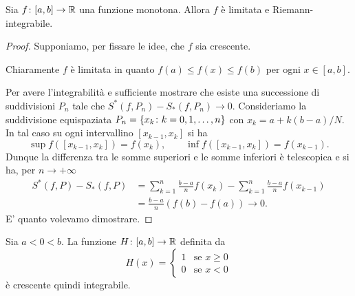   \begin{theorem}
  \label{th:integrabilita_monotone}%
  Sia $f\colon [a,b]\to {\mathbb R}$ una funzione monotona. Allora $f$ è limitata e
  Riemann-integrabile.
  \end{theorem}
  \begin{proof}
  Supponiamo, per fissare le idee, che $f$ sia crescente.
  
  Chiaramente $f$ è limitata in quanto $f(a) \le f(x) \le f(b)$ per ogni
  $x\in [a,b]$.
  
  Per avere l'integrabilità e sufficiente mostrare
  che esiste una successione di suddivisioni $P_n$
  tale che $S^*(f,P_n) - S_*(f,P_n) \to 0$.
  Consideriamo la suddivisione equispaziata
  $P_n={\left\{ x_k \colon k=0,1, \dots, n \right\}}$ con $x_k=a+k(b-a)/N$.
  In tal caso su ogni intervallino $[x_{k-1},x_k]$ si ha
  \[
    \sup f([x_{k-1}, x_k]) = f(x_k),
    \qquad
    \inf f([x_{k-1}, x_k]) = f(x_{k-1}).
  \]
  Dunque la differenza tra le somme superiori
  e le somme inferiori è telescopica
  e si ha, per $n\to +\infty$
  \begin{align*}
  S^*(f,P) - S_*(f,P)
  &= \sum_{k=1}^n \frac{b-a}{n} f(x_k)
    - \sum_{k=1}^n \frac{b-a}{n} f(x_{k-1}) \\
  &= \frac{b-a}{n}(f(b)-f(a)) \to 0.
  \end{align*}
  E' quanto volevamo dimostrare.
  \end{proof}
  
  \begin{example}
  \label{ex:heaviside}
  Sia $a<0<b$.
  La funzione $H\colon [a,b] \to {\mathbb R}$ definita da
  \[
  H(x) =
  \begin{cases}
  1 & \text{se $x\ge 0$}\\
  0 & \text{se $x< 0$}
  \end{cases}
  \]
  è crescente quindi integrabile.
  \end{example}
  
